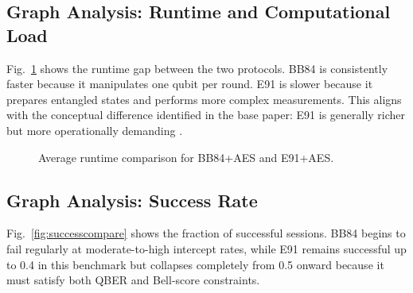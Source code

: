 \documentclass[conference]{IEEEtran}
\begin{document}
\subsection{Graph Analysis: Runtime and Computational Load}
Fig.~\ref{fig:runtimecompare} shows the runtime gap between the two protocols. BB84 is consistently faster because it manipulates one qubit per round. E91 is slower because it prepares entangled states and performs more complex measurements. This aligns with the conceptual difference identified in the base paper: E91 is generally richer but more operationally demanding \cite{ain2025novel}.

\begin{figure}[htbp]
\centering
{}
\caption{Average runtime comparison for BB84+AES and E91+AES.}
\label{fig:runtimecompare}
\end{figure}

\subsection{Graph Analysis: Success Rate}
Fig.~\ref{fig:successcompare} shows the fraction of successful sessions. BB84 begins to fail regularly at moderate-to-high intercept rates, while E91 remains successful up to 0.4 in this benchmark but collapses completely from 0.5 onward because it must satisfy both QBER and Bell-score constraints.
\end{document}
